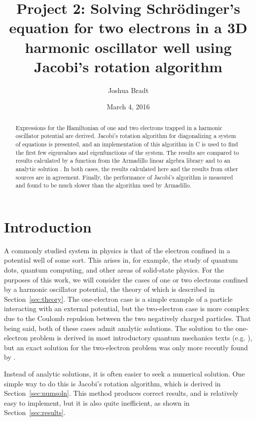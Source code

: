 \documentclass[aps,prc,reprint]{revtex4-1}
\begin{document}
\title{Project 2: Solving Schr\"odinger's equation for two electrons in a 3D harmonic oscillator well using Jacobi's rotation algorithm}
\author{Joshua Bradt}
\noaffiliation
\date{March 4, 2016}

\begin{abstract}
    Expressions for the Hamiltonian of one and two electrons trapped in a harmonic oscillator potential are derived. Jacobi's rotation algorithm for diagonalizing a system of equations is presented, and an implementation of this algorithm in C is used to find the first few eigenvalues and eigenfunctions of the system. The results are compared to results calculated by a function from the Armadillo linear algebra library \cite{Sanderson2010} and to an analytic solution \cite{Taut1993}. In both cases, the results calculated here and the results from other sources are in agreement. Finally, the performance of Jacobi's algorithm is measured and found to be much slower than the algorithm used by Armadillo.
\end{abstract}

\maketitle

\section{Introduction}
\label{sec:introduction}
    A commonly studied system in physics is that of the electron confined in a potential well of some sort. This arises in, for example, the study of quantum dots, quantum computing, and other areas of solid-state physics. \cite{courserepo} For the purposes of this work, we will consider the cases of one or two electrons confined by a harmonic oscillator potential, the theory of which is described in Section~\ref{sec:theory}. The one-electron case is a simple example of a particle interacting with an external potential, but the two-electron case is more complex due to the Coulomb repulsion between the two negatively charged particles. That being said, both of these cases admit analytic solutions. The solution to the one-electron problem is derived in most introductory quantum mechanics texts (e.g. \textcite[p. 351]{Shankar1994}), but an exact solution for the two-electron problem was only more recently found by \textcite{Taut1993}.

    Instead of analytic solutions, it is often easier to seek a numerical solution. One simple way to do this is Jacobi's rotation algorithm, which is derived in Section~\ref{sec:numsoln}. This method produces correct results, and is relatively easy to implement, but it is also quite inefficient, as shown in Section~\ref{sec:results}.
\end{document}
